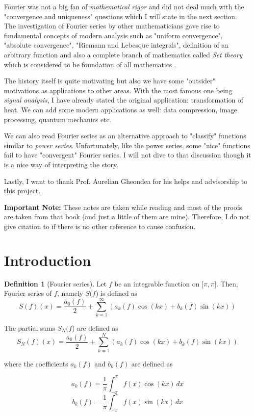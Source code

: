 \documentclass[12pt]{amsart}
\theoremstyle{definition}
\newtheorem{definition}[theorem]{Definition}
\begin{document}
Fourier was not a big fan of \emph{mathematical rigor} and did not deal much with the "convergence and uniqueness" questions which I will state in the next section. The investigation of Fourier series by other mathematicians gave rise to fundamental concepts of modern analysis such as "uniform convergence", "absolute convergence", "Riemann and Lebesque integrals", definition of an arbitrary function and also a complete branch of mathematics called \emph{Set theory} which is considered to be foundation of all mathematics \cite{History}.



The history itself is quite motivating but also we have some "outsider" motivations as applications to other areas. With the most famous one being \emph{signal analysis}, I have already stated the original application: transformation of heat. We can add some modern applications as well: data compression, image processing, quantum mechanics etc.


We can also read Fourier series as an alternative approach to "classify" functions similar to \emph{power series}. Unfortunately, like the power series, some "nice" functions fail to have "convergent" Fourier series. I will not dive to that discussion though it is a nice way of interpreting the story.

Lastly, I want to thank Prof. Aurelian Gheondea for his helps and advisorship to this project.

\textbf{Important Note:} These notes are taken while reading \cite{Wade} and most of the proofs are taken from that book (and just a little of them are mine). Therefore, I do not give citation to \cite{Wade} if there is no other reference to cause confusion.

\section{Introduction}


\begin{definition}[Fourier series]\footnotemark{}






    Let \(f\) be an integrable function on [$\pi, \pi$]. Then, Fourier series of \(f\), namely $S($\(f\)) is defined as
    \[
    S(f)(x) = \frac{a_0(f)}{2} +  \sum_{k = 1}^{\infty} (a_k(f)  \cos(kx) + b_k(f)  \sin(kx))
    \]

    The partial sums $S_N($\(f\)) are defined as
    \[
    S_N(f)(x) = \frac{a_0(f)}{2} +  \sum_{k = 1}^{N} (a_k(f)  \cos(kx) + b_k(f)  \sin(kx))
    \]

    where the coefficients $a_k(f)$ and $b_k(f)$ are defined as

    \[
    a_k(f) = \frac{1}{\pi}\int_{-\pi}^{\pi} f(x) \cos(kx)\,dx
    \]
    \[
    b_k(f) = \frac{1}{\pi}\int_{-\pi}^{\pi} f(x) \sin(kx)\,dx
    \]
\end{definition}
\end{document}
